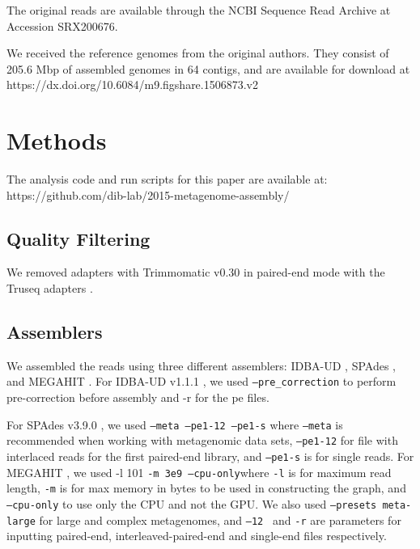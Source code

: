 \documentclass[10pt,a4paper,twocolumn]{article}
\begin{document}
The original reads are available through
the NCBI Sequence Read Archive at Accession SRX200676.

We received the reference genomes from the original authors. They consist of 205.6 Mbp of assembled genomes in 64 contigs, and are available for download at
https://dx.doi.org/10.6084/m9.figshare.1506873.v2



\section*{Methods}
The analysis code and run scripts for this paper are available at: https://github.com/dib-lab/2015-metagenome-assembly/

\subsection*{Quality Filtering} 

We removed adapters with Trimmomatic v0.30 in paired-end mode with the
Truseq adapters \cite{trimmomatic}.


\subsection*{Assemblers}
We assembled the reads using three different assemblers:  IDBA-UD \cite{idba}, SPAdes \cite{spades}, and MEGAHIT \cite{megahit}.
For IDBA-UD v1.1.1 \cite{idba},  we used  {\tt  {--pre\_correction}} to perform pre-correction before assembly and -r for the pe files. 

For SPAdes v3.9.0 \cite{spades}, we used { \tt {--meta  --pe1-12 --pe1-s}} where {\tt{--meta}} is recommended when working with metagenomic data sets,  {\tt{--pe1-12}} for file with interlaced reads for the first paired-end library, and  {\tt{--pe1-s}} is for single reads. 
For MEGAHIT \cite{megahit}, we used -l 101 {\tt{-m 3e9 --cpu-only}}where {\tt -l} is for maximum read length, {\tt -m} is for max memory in bytes to be used in constructing the graph, and {\tt {--cpu-only}} to use only the CPU and not the GPU. We also used {\tt {--presets meta-large}} for large and  complex metagenomes, and {\tt {--12} } and {\tt{-r}} are parameters for inputting paired-end, interleaved-paired-end and single-end files respectively.
\end{document}
